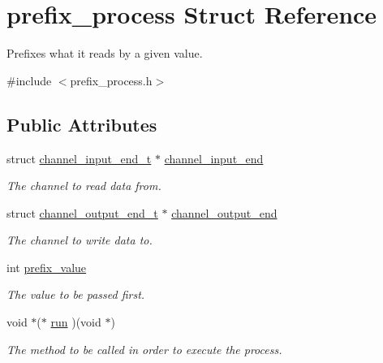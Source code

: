 \hypertarget{structprefix__process}{\section{prefix\-\_\-process Struct Reference}
\label{structprefix__process}
}


Prefixes what it reads by a given value.  




{\ttfamily \#include $<$prefix\-\_\-process.\-h$>$}

\subsection*{Public Attributes}
\begin{DoxyCompactItemize}
\item 
\hypertarget{structprefix__process_ad1fd0fc8d5bfed1fcfaae1ed56ab7d71}{struct \hyperlink{structchannel__input__end__t}{channel\-\_\-input\-\_\-end\-\_\-t} $\ast$ \hyperlink{structprefix__process_ad1fd0fc8d5bfed1fcfaae1ed56ab7d71}{channel\-\_\-input\-\_\-end}}\label{structprefix__process_ad1fd0fc8d5bfed1fcfaae1ed56ab7d71}

\begin{DoxyCompactList}\small\item\em The channel to read data from. \end{DoxyCompactList}\item 
\hypertarget{structprefix__process_af7b15847a5a8e9779b4eca6a47c76753}{struct \hyperlink{structchannel__output__end__t}{channel\-\_\-output\-\_\-end\-\_\-t} $\ast$ \hyperlink{structprefix__process_af7b15847a5a8e9779b4eca6a47c76753}{channel\-\_\-output\-\_\-end}}\label{structprefix__process_af7b15847a5a8e9779b4eca6a47c76753}

\begin{DoxyCompactList}\small\item\em The channel to write data to. \end{DoxyCompactList}\item 
\hypertarget{structprefix__process_a9e5b05605c8f117745b0ee5c7e04c4e1}{int \hyperlink{structprefix__process_a9e5b05605c8f117745b0ee5c7e04c4e1}{prefix\-\_\-value}}\label{structprefix__process_a9e5b05605c8f117745b0ee5c7e04c4e1}

\begin{DoxyCompactList}\small\item\em The value to be passed first. \end{DoxyCompactList}\item 
\hypertarget{structprefix__process_a7b808d2e3ad3522225a0abc39ac362ae}{void $\ast$($\ast$ \hyperlink{structprefix__process_a7b808d2e3ad3522225a0abc39ac362ae}{run} )(void $\ast$)}\label{structprefix__process_a7b808d2e3ad3522225a0abc39ac362ae}

\begin{DoxyCompactList}\small\item\em The method to be called in order to execute the process. \end{DoxyCompactList}\end{DoxyCompactItemize}


